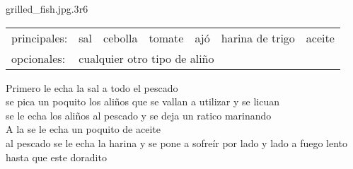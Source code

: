 {grilled_fish.jpg}{.3\textwidth}{r}{6} %
{ %
    \begin{tabular}[t]{@{}*{7}{l}@{}}
        principales: & sal & cebolla & tomate & ajó & harina de trigo & aceite \\
        opcionales: & \multicolumn{6}{l}{cualquier otro tipo de aliño} \\
    \end{tabular}
}

Primero le echa la sal a todo el pescado \\
se pica un poquito los aliños que se vallan a utilizar y se licuan \\
se le echa los aliños al pescado y se deja un ratico marinando \\
A la se le echa un poquito de aceite \\
al pescado se le echa la harina y se pone a sofreír por lado y lado a fuego lento hasta que este doradito